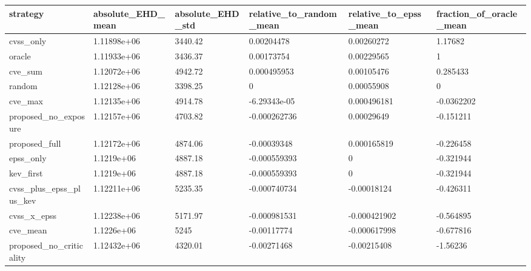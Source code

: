 \begin{tabular}{l l l l l l}
\hline
strategy & absolute\_EHD\_mean & absolute\_EHD\_std & relative\_to\_random\_mean & relative\_to\_epss\_mean & fraction\_of\_oracle\_mean \\
\hline
cvss\_only & 1.11898e+06 & 3440.42 & 0.00204478 & 0.00260272 & 1.17682 \\
oracle & 1.11933e+06 & 3436.37 & 0.00173754 & 0.00229565 & 1 \\
cve\_sum & 1.12072e+06 & 4942.72 & 0.000495953 & 0.00105476 & 0.285433 \\
random & 1.12128e+06 & 3398.25 & 0 & 0.00055908 & 0 \\
cve\_max & 1.12135e+06 & 4914.78 & -6.29343e-05 & 0.000496181 & -0.0362202 \\
proposed\_no\_exposure & 1.12157e+06 & 4703.82 & -0.000262736 & 0.00029649 & -0.151211 \\
proposed\_full & 1.12172e+06 & 4874.06 & -0.00039348 & 0.000165819 & -0.226458 \\
epss\_only & 1.1219e+06 & 4887.18 & -0.000559393 & 0 & -0.321944 \\
kev\_first & 1.1219e+06 & 4887.18 & -0.000559393 & 0 & -0.321944 \\
cvss\_plus\_epss\_plus\_kev & 1.12211e+06 & 5235.35 & -0.000740734 & -0.00018124 & -0.426311 \\
cvss\_x\_epss & 1.12238e+06 & 5171.97 & -0.000981531 & -0.000421902 & -0.564895 \\
cve\_mean & 1.1226e+06 & 5245 & -0.00117774 & -0.000617998 & -0.677816 \\
proposed\_no\_criticality & 1.12432e+06 & 4320.01 & -0.00271468 & -0.00215408 & -1.56236 \\
\hline
\end{tabular}
